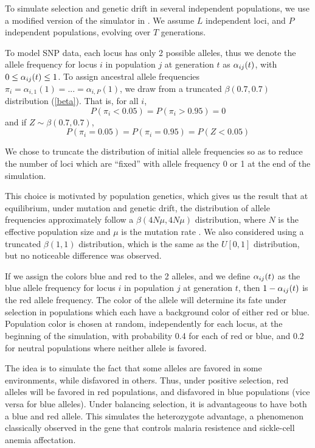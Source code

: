 \documentclass[a4paper,12pt]{article}
\begin{document}
To simulate selection and genetic drift in several independent
populations, we use a modified version of the simulator in
\cite{Beaumont-Balding}. We assume $L$ independent loci, and $P$
independent populations, evolving over $T$ generations.

To model SNP data, each locus has only 2 possible alleles, thus we
denote the allele frequency for locus $i$ in population $j$ at
generation $t$ as $\alpha_{ij}(t)$, with $0\leq \alpha_{ij}(t)\leq 1$. To assign ancestral
allele frequencies $\pi_i=\alpha_{i,1}(1)=...=\alpha_{i,P}(1)$, we
draw from a truncated $\beta(0.7,0.7)$ distribution
(\autoref{beta}). That is, for all $i$,
$$P(\pi_i<0.05)=P(\pi_i>0.95)=0$$
and if $Z\sim\beta(0.7,0.7)$,
$$P(\pi_i=0.05)=P(\pi_i=0.95)=P(Z<0.05)$$

We chose to truncate the distribution of initial allele frequencies so
as to reduce the number of loci which are ``fixed'' with allele
frequency 0 or 1 at the end of the simulation.

This choice is motivated by population genetics, which gives us the
result that at equilibrium, under mutation and genetic drift, the
distribution of allele frequencies approximately follow a
$\beta(4N\mu,4N\mu)$ distribution, where $N$ is the effective
population size and $\mu$ is the mutation rate \cite{Wright}. We
also considered using a truncated $\beta(1,1)$ distribution, which is
the same as the $U[0,1]$ distribution, but no noticeable difference
was observed.


If we assign the colors blue and red to the 2 alleles, and we define
$\alpha_{ij}(t)$ as the blue allele frequency for locus $i$ in population $j$ at
generation $t$, then $1-\alpha_{ij}(t)$ is the red allele frequency. The color
of the allele will determine its fate under selection in populations
which each have a background color of either red or blue. Population
color is chosen at random, independently for each locus, at the
beginning of the simulation, with probability 0.4 for each of red or
blue, and 0.2 for neutral populations where neither allele is favored.

The idea is to simulate the fact that some alleles are favored in some
environments, while disfavored in others. Thus, under positive
selection, red alleles will be favored in red populations, and
disfavored in blue populations (vice versa for blue alleles). Under
balancing selection, it is advantageous to have both a blue and red
allele. This simulates the heterozygote advantage, a phenomenon
classically observed in the gene that controls malaria resistence and
sickle-cell anemia affectation.
\end{document}
